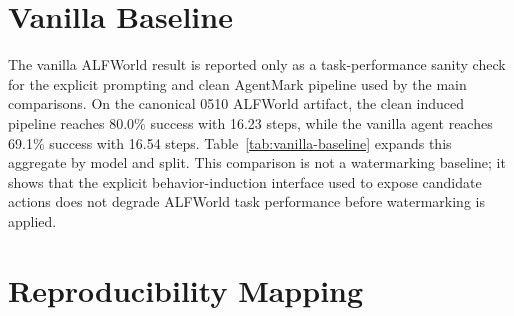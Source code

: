 \documentclass[conference,compsoc]{IEEEtran}
\begin{document}
\section{Vanilla Baseline}
\label{app:vanilla-baseline}

The vanilla ALFWorld result is reported only as a task-performance sanity check for the explicit prompting and clean AgentMark pipeline used by the main comparisons. On the canonical 0510 ALFWorld artifact, the clean induced pipeline reaches 80.0\% success with 16.23 steps, while the vanilla agent reaches 69.1\% success with 16.54 steps. Table~\ref{tab:vanilla-baseline} expands this aggregate by model and split. This comparison is not a watermarking baseline; it shows that the explicit behavior-induction interface used to expose candidate actions does not degrade ALFWorld task performance before watermarking is applied.

\begin{table}[h]
\centering
\caption{ALFWorld vanilla sanity check for explicit behavior induction, expanded by model and split. Success and steps are mean$\pm$standard deviation over the completed runs.}
\label{tab:vanilla-baseline}
\end{table}

\section{Reproducibility Mapping}
\label{app:artifacts}
\end{document}
